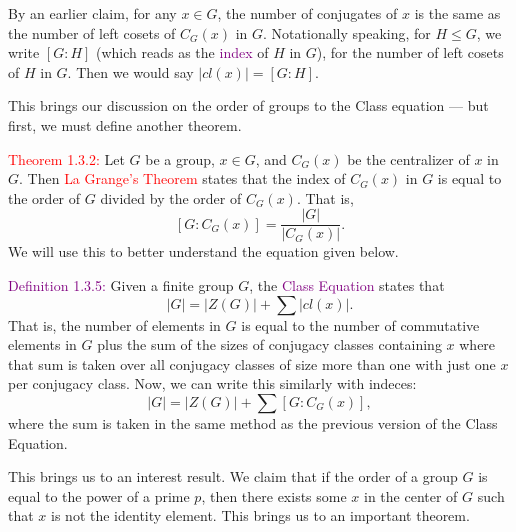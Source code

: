 \documentclass{article}
\begin{document}
By an earlier claim, for any $x \in G$, the number of conjugates of $x$ is the same as the number of left cosets of $C_G(x)$ in $G$. 
Notationally speaking, for $H \leq G$, we write $[G:H]$ (which reads as the \textcolor{purple}{index} of $H$ in $G$), for the number of 
left cosets of $H$ in $G$. Then we would say $|cl(x)| = [G:H]$.

This brings our discussion on the order of groups to the Class equation --- but first, we must define another theorem.

\textcolor{red}{Theorem 1.3.2:} Let $G$ be a group, $x \in G$, and $C_G(x)$ be the centralizer of $x$ in $G$. Then 
\textcolor{red}{La Grange's Theorem} states that the index of $C_G(x)$ in $G$ is equal to the order of $G$ divided by the order of 
$C_G(x)$. That is,
\[
    [G:C_G(x)] = \dfrac{|G|}{|C_G(x)|}.
\]
We will use this to better understand the equation given below.

\textcolor{purple}{Definition 1.3.5:} Given a finite group $G$, the \textcolor{purple}{Class Equation} states that 
\[
    |G| = |Z(G)| + \sum{|cl(x)|}.
\]
That is, the number of elements in $G$ is equal to the number of commutative elements in $G$ plus the sum of the sizes of conjugacy 
classes containing $x$ where that sum is taken over all conjugacy classes of size more than one with just one $x$ per conjugacy class. 
Now, we can write this similarly with indeces:
\[
    |G| = |Z(G)|+\sum{[G:C_G(x)]},
\]
where the sum is taken in the same method as the previous version of the Class Equation.

This brings us to an interest result. We claim that if the order of a group $G$ is equal to the power of a prime $p$, then there exists 
some $x$ in the center of $G$ such that $x$ is not the identity element. This brings us to an important theorem.
\end{document}
